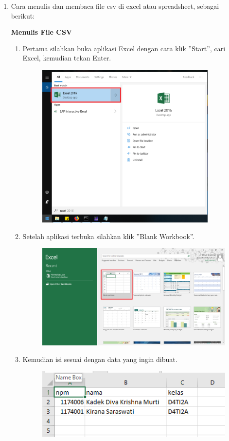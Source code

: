 \begin{enumerate}
	\item Cara menulis dan membaca file csv di excel atau spreadsheet, sebagai berikut:
	
	\textbf{Menulis File CSV}
	
	\begin{enumerate}
		\item Pertama silahkan buka aplikasi Excel dengan cara klik ''Start'', cari Excel, kemudian tekan Enter.
		
		\begin{figure}[H]
			\includegraphics[width=9cm]{figures/diva/Chapter4/t1.png}
			\centering
		\end{figure}
		
		\item Setelah aplikasi terbuka silahkan klik ''Blank Workbook''.
		
		\begin{figure}[H]
			\includegraphics[width=10cm]{figures/diva/Chapter4/t2.png}
			\centering
		\end{figure}
		
		\item Kemudian isi sesuai dengan data yang ingin dibuat.
		
		\begin{figure}[H]
			\includegraphics[width=10cm]{figures/diva/Chapter4/t3.png}
			\centering
		\end{figure}
		

\end{enumerate}
\end{enumerate}

